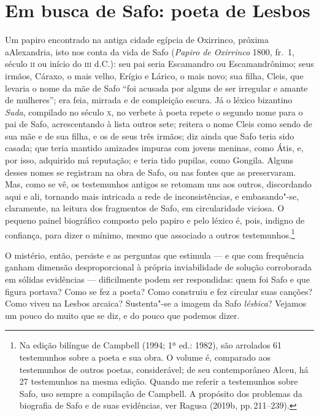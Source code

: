 \section*{Em busca de Safo: poeta de Lesbos}

Um papiro encontrado na antiga cidade egípcia de Oxirrinco, próxima a\EP[]
Alexandria, isto nos conta da vida de Safo (\textit{Papiro de Oxirrinco} 1800,
fr.~1, século \textsc{ii} ou início do \textsc{iii} d.C.): seu pai seria Escamandro ou
Escamandrônimo; seus irmãos, Cáraxo, o mais velho, Erígio e Lárico, o mais
novo; sua filha, Cleis, que levaria o nome da mãe de Safo ``foi acusada
por alguns de ser irregular e amante de mulheres”; era feia, mirrada e de
compleição escura. Já o léxico bizantino \textit{Suda}, compilado no século \textsc{x},
no verbete à poeta repete o segundo nome para o pai de Safo, acrescentando à
lista outros sete; reitera o nome Cleis como sendo de sua mãe e de sua filha, e
os de seus três irmãos; diz ainda que Safo teria sido casada; que teria mantido
amizades impuras com jovens meninas, como Átis, e, por isso, adquirido má
reputação; e teria tido pupilas, como Gongila. Alguns desses nomes se registram
na obra de Safo, ou nas fontes que as preservaram. Mas, como se vê, os
testemunhos antigos se retomam uns aos outros, discordando aqui e ali, tornando
mais intricada a rede de inconsistências, e embasando"-se, claramente, na
leitura dos fragmentos de Safo, em circularidade viciosa. O pequeno painel
biográfico composto pelo papiro e pelo léxico é, pois, indigno de confiança,
para dizer o mínimo, mesmo que associado a outros testemunhos.\footnote{ Na
edição bilíngue de Campbell (1994; 1ª ed.: 1982), são arrolados 61 testemunhos
sobre a poeta e sua obra. O volume é, \mbox{comparado} aos testemunhos de outros
poetas, considerável; de seu contemporâneo Alceu, há 27 testemunhos na mesma edição. 
Quando me referir a testemunhos sobre Safo, uso
sempre a compilação de Campbell. A propósito dos problemas da biografia de Safo e de suas evidências, ver Ragusa (2019b, pp.\,211--239).}

O mistério, então, persiste e as perguntas que estimula --- e que com frequência
ganham dimensão desproporcional à própria inviabilidade de solução
corroborada em sólidas evidências --- dificilmente podem ser respondidas: quem
foi Safo e que figura portava? Como se fez a poeta? Como construiu e fez
circular suas canções? Como viveu na Lesbos arcaica? Sustenta"-se a imagem da
Safo \textit{lésbica}? Vejamos um pouco do muito que se diz, e do
pouco que podemos dizer.

